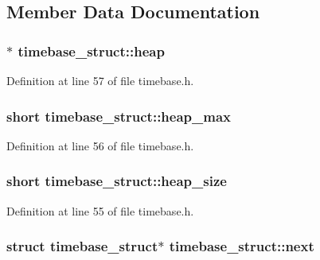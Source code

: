 \subsection{Member Data Documentation}
\subsubsection[{\texorpdfstring{heap}{heap}}]{$\ast$ timebase\+\_\+struct\+::heap}\hypertarget{structtimebase__struct_afce39c5827a70c2de6249ca2d473539f}{}\label{structtimebase__struct_afce39c5827a70c2de6249ca2d473539f}


Definition at line 57 of file timebase.\+h.

\subsubsection[{\texorpdfstring{heap\+\_\+max}{heap_max}}]{\setlength{\rightskip}{0pt plus 5cm}short timebase\+\_\+struct\+::heap\+\_\+max}\hypertarget{structtimebase__struct_a7765b91dfd02b085a2a4f6699363ba0b}{}\label{structtimebase__struct_a7765b91dfd02b085a2a4f6699363ba0b}


Definition at line 56 of file timebase.\+h.

\subsubsection[{\texorpdfstring{heap\+\_\+size}{heap_size}}]{\setlength{\rightskip}{0pt plus 5cm}short timebase\+\_\+struct\+::heap\+\_\+size}\hypertarget{structtimebase__struct_a5f145edb534454276ec7076d3d9ece31}{}\label{structtimebase__struct_a5f145edb534454276ec7076d3d9ece31}


Definition at line 55 of file timebase.\+h.

\subsubsection[{\texorpdfstring{next}{next}}]{\setlength{\rightskip}{0pt plus 5cm}struct {\bf timebase\+\_\+struct}$\ast$ timebase\+\_\+struct\+::next}\hypertarget{structtimebase__struct_acc66c402d59aa01f42cfa2169ea2af16}{}\label{structtimebase__struct_acc66c402d59aa01f42cfa2169ea2af16}



